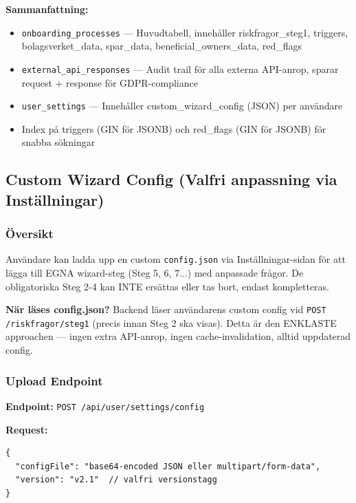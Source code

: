 \documentclass[12pt,a4paper]{article}
\begin{document}
\textbf{Sammanfattning:}
\begin{itemize}[noitemsep]
  \item \texttt{onboarding\_processes} — Huvudtabell, innehåller riskfragor\_steg1, triggers, bolagsverket\_data, spar\_data, beneficial\_owners\_data, red\_flags
  \item \texttt{external\_api\_responses} — Audit trail för alla externa API-anrop, sparar request + response för GDPR-compliance
  \item \texttt{user\_settings} — Innehåller custom\_wizard\_config (JSON) per användare
  \item Index på triggers (GIN för JSONB) och red\_flags (GIN för JSONB) för snabba sökningar
\end{itemize}

\subsection{Custom Wizard Config (Valfri anpassning via Inställningar)}

\subsubsection{Översikt}

Användare kan ladda upp en custom \texttt{config.json} via Inställningar-sidan för att lägga till EGNA wizard-steg (Steg 5, 6, 7...) med anpassade frågor. De obligatoriska Steg 2-4 kan INTE ersättas eller tas bort, endast kompletteras.

\textbf{När läses config.json?} Backend läser användarens custom config vid \texttt{POST /riskfragor/steg1} (precis innan Steg 2 ska visas). Detta är den ENKLASTE approachen — ingen extra API-anrop, ingen cache-invalidation, alltid uppdaterad config.

\subsubsection{Upload Endpoint}

\textbf{Endpoint:} \texttt{POST /api/user/settings/config}

\textbf{Request:}
\begin{lstlisting}
{
  "configFile": "base64-encoded JSON eller multipart/form-data",
  "version": "v2.1"  // valfri versionstagg
}
\end{lstlisting}
\end{document}
